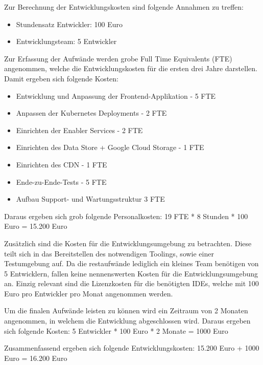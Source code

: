 Zur Berechnung der Entwicklungskosten sind folgende Annahmen zu treffen:
\begin{itemize}
    \item Stundensatz Entwickler: 100 Euro
    \item Entwicklungsteam: 5 Entwickler
\end{itemize}

Zur Erfassung der Aufwände werden grobe Full Time Equivalents (FTE) angenommen, welche die Entwicklungskosten für die ersten drei Jahre darstellen.
Damit ergeben sich folgende Kosten:
\begin{itemize}
    \item Entwicklung und Anpassung der Frontend-Applikation - 5 FTE
    \item Anpassen der Kubernetes Deployments - 2 FTE
    \item Einrichten der Enabler Services - 2 FTE
    \item Einrichten des Data Store + Google Cloud Storage - 1 FTE
    \item Einrichten des CDN - 1 FTE
    \item Ende-zu-Ende-Tests - 5 FTE
    \item Aufbau Support- und Wartungsstruktur 3 FTE
\end{itemize}

Daraus ergeben sich grob folgende Personalkosten:
19 FTE * 8 Stunden * 100 Euro = 15.200 Euro

Zusätzlich sind die Kosten für die Entwicklungsumgebung zu betrachten.
Diese teilt sich in das Bereitstellen des notwendigen Toolings, sowie einer Testumgebung auf.
Da die restaufwände lediglich ein kleines Team benötigen von 5 Entwicklern, fallen keine nennenswerten Kosten für die Entwicklungsumgebung an.
Einzig relevant sind die Lizenzkosten für die benötigten IDEs, welche mit 100 Euro pro Entwickler pro Monat angenommen werden.

Um die finalen Aufwände leisten zu können wird ein Zeitraum von 2 Monaten angenommen, in welchem die Entwicklung abgeschlossen wird.
Daraus ergeben sich folgende Kosten:
5 Entwickler * 100 Euro * 2 Monate = 1000 Euro

Zusammenfassend ergeben sich folgende Entwicklungskosten:
15.200 Euro + 1000 Euro = 16.200 Euro


